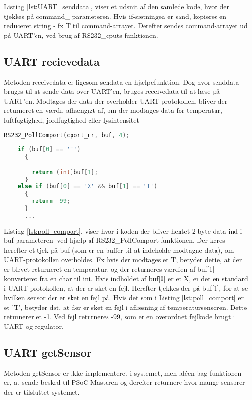 Listing \ref{lst:UART_senddata}, viser et udsnit af den samlede kode, hvor der tjekkes på command\_ parameteren. Hvis if-sætningen er sand, kopieres en reduceret string - fx T til command-arrayet. Derefter sendes command-arrayet ud på UART'en, ved brug af RS232\_cputs funktionen.

\subsection{UART recievedata}

Metoden receivedata er ligesom sendata en hjælpefunktion. Dog hvor senddata bruges til at sende data over UART'en, bruges receivedata til at læse på UART'en. Modtages der data der overholder UART-protokollen, bliver der returneret en værdi, afhængigt af, om der modtages data for temperatur, luftfugtighed, jordfugtighed eller lysintensitet

\begin{lstlisting}[language=C ,caption=kodeafsnit af indsamling af data på rx, label=lst:poll_comport]
	RS232_PollComport(cport_nr, buf, 4);
	
	if (buf[0] == 'T')
	  {

	    return (int)buf[1];
	  }
	else if (buf[0] == 'X' && buf[1] == 'T')
	  {
	    return -99;
	  }
	  ...
\end{lstlisting}

Listing \ref{lst:poll_comport}, viser hvor i koden der bliver hentet 2 byte data ind i buf-parameteren, ved hjælp af RS232\_PollComport funktionen.
Der køres herefter et tjek på buf (som er en buffer til at indeholde modtagne data), om UART-protokollen overholdes. Fx hvis der modtages et T, betyder dette, at der er blevet returneret en temperatur, og der returneres værdien af buf[1] konverteret fra en char til int. Hvis indholdet af buf[0] er et X, er det en standard i UART-protokollen, at der er sket en fejl. Herefter tjekkes der på buf[1], for at se hvilken sensor der er sket en fejl på. Hvis det som i Listing \ref{lst:poll_comport} er et 'T', betyder det, at der er sket en fejl i aflæsning af temperatursensoren. Dette returnerer et -1.
Ved fejl returneres -99, som er en overordnet fejlkode brugt i UART og regulator.

\subsection{UART getSensor} 

Metoden getSensor er ikke implementeret i systemet, men idéen bag funktionen er, at sende besked til PSoC Masteren og derefter returnere hvor mange sensorer der er tilsluttet systemet.

